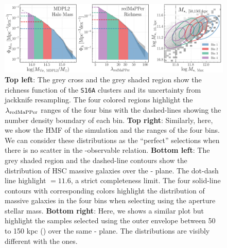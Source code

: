 \documentclass[fleqn,usenatbib,useAMS,english]{mnras}
\begin{document}
    \begin{figure}
        \centering
        \includegraphics[width=16cm]{figure/topn_fig_4}
        \caption{
            \textbf{Top left}:
            The grey cross and the grey shaded region show the richness function of the
            \texttt{S16A} \redm{} clusters and its uncertainty from jackknife resampling.
            The four colored regions highlight the $\lambda_{\rm redMaPPer}$ ranges of the four
            \topn{} bins with the dashed-lines showing the number density boundary of each bin.
            \textbf{Top right}:
            Similarly, here, we show the HMF of the  simulation and the \mhalo{} ranges
            of the four \topn{} bins.
            We can consider these \mhalo{} distributions as the ``perfect'' \topn{} selections
            when there is no scatter in the \mhalo{}-observable relation.
            \textbf{Bottom left}:
            The grey shaded region and the dashed-line contours show the distribution of HSC
            massive galaxies over the \mmax{}-\minn{} plane.
            The dot-dash line highlight \logmmax{}$=11.6$, a strict \mmax{} completeness
            limit.
            The four solid-line contours with corresponding colors highlight the distribution
            of massive galaxies in the four \topn{} bins when selecting using the 
            aperture stellar mass.
            \textbf{Bottom right}:
            Here, we shows a similar plot but highlight the \topn{} samples selected using
            the outer envelope \mstar{} between 50 to 150 kpc () over the
            same \mmax{}-\minn{} plane.
            The distributions are visibly different with the  ones.}
        \label{fig:density_bins}
    \end{figure}
\end{document}
